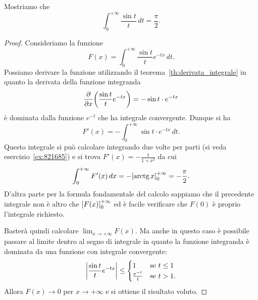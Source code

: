 \begin{exercise}
  \label{ex:integrale_sin_integrale}%
Mostriamo che 
  \[
    \int_0^{+\infty} \frac{\sin t}{t}\, dt = \frac \pi 2.
  \] 
\end{exercise}
\begin{proof}
Consideriamo la funzione 
\[
  F(x) = \int_0^{+\infty} \frac{\sin t}{t}e^{-tx}\, dt.
\]
Possiamo derivare la funzione utilizzando il teorema~\ref{th:derivata_integrale}
in quanto la derivata della funzione integranda 
\[
  \frac{\partial}{\partial x}{\left( \frac{\sin t}{t}e^{-tx} \right)} 
  = -\sin t \cdot e^{-tx}
\]
è dominata dalla funzione $e^{-t}$
che ha integrale convergente.
Dunque si ha 
\[
  F'(x) = - \int_0^{+\infty} \sin t \cdot e^{-tx}\, dt. 
\]
Questo integrale si può calcolare integrando due volte per parti 
(si veda esercizio~\ref{ex:821685}) e si trova 
$F'(x) = -\frac{1}{1+x^2}$ da cui 
\[
  \int_0^{+\infty} F'(x)\, dx = -{\left[ \operatorname{arctg} x \right]}_0^{+\infty} = - \frac \pi 2.
\]
D'altra parte per la formula fondamentale del calcolo 
sappiamo che il precedente integrale 
non è altro che ${\left[ F(x) \right]}_0^{+\infty}$ ed è facile 
verificare che $F(0)$ è proprio l'integrale richiesto.

Basterà quindi calcolare $\lim_{x\to+\infty} F(x)$.
Ma anche in questo caso è possibile passare al limite 
dentro al segno di integrale in quanto la funzione 
integranda è dominata da una funzione con integrale convergente:
\[
{\left|\frac{\sin t}{t}e^{-tx}\right|} \le 
\begin{cases}
  1 & \text{se $t\le 1$}\\
  \frac{e^{-t}}{t} & \text{se $t>1$}. 
\end{cases}
\]
Allora $F(x) \to 0$ per $x\to +\infty$ e si ottiene il risultato voluto.
\end{proof}

